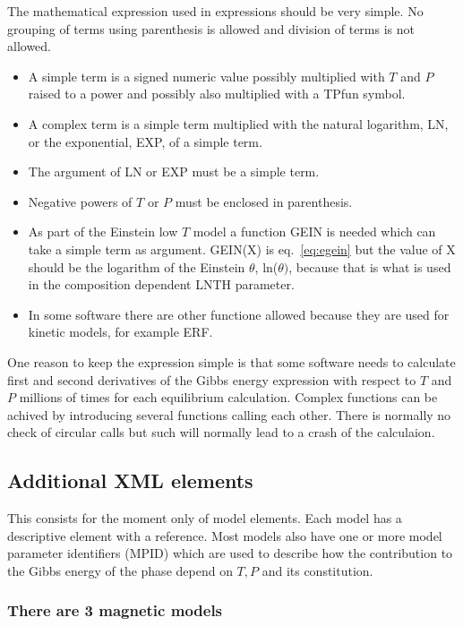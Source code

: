 \documentclass[12pt]{article}
\begin{document}
\begin{appendices}
The mathematical expression used in expressions should be very simple.
No grouping of terms using parenthesis is allowed and division of
terms is not allowed.
\begin{itemize}
\item A simple term is a signed numeric value possibly multiplied with
  $T$ and $P$ raised to a power and possibly also multiplied with a
  TPfun symbol.
\item A complex term is a simple term multiplied with the natural
  logarithm, LN, or the exponential, EXP, of a simple term.
\item The argument of LN or EXP must be a simple term.
\item Negative powers of $T$ or $P$ must be enclosed in parenthesis.
\item As part of the Einstein low $T$ model a function GEIN is needed
  which can take a simple term as argument.  GEIN(X) is
  eq.~\ref{eq:egein} but the value of X should be the logarithm of the
  Einstein $\theta$, ln($\theta)$, because that is what is used in the
  composition dependent LNTH parameter.
\item In some software there are other functione allowed because they
  are used for kinetic models, for example ERF.
\end{itemize}

One reason to keep the expression simple is that some software needs
to calculate first and second derivatives of the Gibbs energy
expression with respect to $T$ and $P$ millions of times for each
equilibrium calculation.  Complex functions can be achived by
introducing several functions calling each other.  There is normally
no check of circular calls but such will normally lead to a crash of
the calculaion.

\subsection{Additional XML elements}

This consists for the moment only of model elements.  Each model has a
descriptive element with a reference.  Most models also have one or
more model parameter identifiers (MPID) which are used to describe how
the contribution to the Gibbs energy of the phase depend on $T, P$ and
its constitution.

\subsubsection{There are 3 magnetic models}


\end{appendices}
\end{document}
